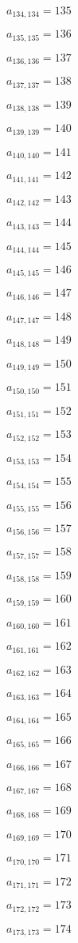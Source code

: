 \documentclass[a4paper,12pt]{article}
\begin{document}
$a _{ 134, 134 } = 135$

$a _{ 135, 135 } = 136$

$a _{ 136, 136 } = 137$

$a _{ 137, 137 } = 138$

$a _{ 138, 138 } = 139$

$a _{ 139, 139 } = 140$

$a _{ 140, 140 } = 141$

$a _{ 141, 141 } = 142$

$a _{ 142, 142 } = 143$

$a _{ 143, 143 } = 144$

$a _{ 144, 144 } = 145$

$a _{ 145, 145 } = 146$

$a _{ 146, 146 } = 147$

$a _{ 147, 147 } = 148$

$a _{ 148, 148 } = 149$

$a _{ 149, 149 } = 150$

$a _{ 150, 150 } = 151$

$a _{ 151, 151 } = 152$

$a _{ 152, 152 } = 153$

$a _{ 153, 153 } = 154$

$a _{ 154, 154 } = 155$

$a _{ 155, 155 } = 156$

$a _{ 156, 156 } = 157$

$a _{ 157, 157 } = 158$

$a _{ 158, 158 } = 159$

$a _{ 159, 159 } = 160$

$a _{ 160, 160 } = 161$

$a _{ 161, 161 } = 162$

$a _{ 162, 162 } = 163$

$a _{ 163, 163 } = 164$

$a _{ 164, 164 } = 165$

$a _{ 165, 165 } = 166$

$a _{ 166, 166 } = 167$

$a _{ 167, 167 } = 168$

$a _{ 168, 168 } = 169$

$a _{ 169, 169 } = 170$

$a _{ 170, 170 } = 171$

$a _{ 171, 171 } = 172$

$a _{ 172, 172 } = 173$

$a _{ 173, 173 } = 174$
\end{document}
